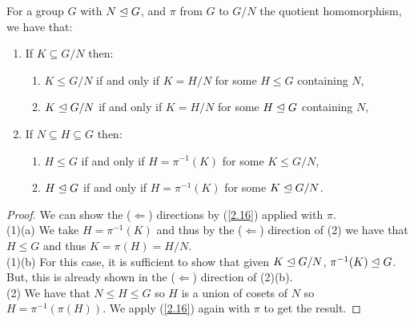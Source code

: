 For a group $G$ with $N \trianglelefteq G$, and $\pi$ from $G$ to $G / N$ the quotient 
homomorphism, we have that: \begin{enumerate}
    \item If $K \subseteq G/N$ then: \begin{enumerate}
        \item $K \leq G/N$ if and only if $K = H/N$ for some
            $H \leq G$ containing $N$,
        \item $K \trianglelefteq G/N$ if and only if $K = H/N$ for some
            $H \trianglelefteq G$ containing $N$,
    \end{enumerate}
    \item If $N \subseteq H \subseteq G$ then: \begin{enumerate}
        \item $H \leq G$ if and only if $H = \pi^{-1}(K)$
            for some $K \leq G/N$,
        \item $H \trianglelefteq G$ if and only if $H = \pi^{-1}(K)$
            for some $K \trianglelefteq G/N$.
    \end{enumerate}
\end{enumerate}

\begin{proof}
    We can show the ($\Longleftarrow$) directions by (\ref{2.16}) applied
    with $\pi$.
    \\[\baselineskip]
    (1)(a) We take $H = \pi^{-1}(K)$ and thus by the ($\Longleftarrow$) direction 
    of (2) we have that $H \leq G$ and thus $K = \pi(H) = H / N$.
    \\[\baselineskip]
    (1)(b) For this case, it is sufficient to show that given $K \trianglelefteq G / N$,
    $\pi^{-1}(K) \trianglelefteq G$. But, this is already shown in the ($\Longleftarrow$)
    direction of (2)(b).
    \\[\baselineskip]
    (2) We have that $N \leq H \leq G$ so $H$ is a union of cosets of $N$
    so $H = \pi^{-1}(\pi(H))$. We apply (\ref{2.16}) again with $\pi$ to
    get the result.
\end{proof}
